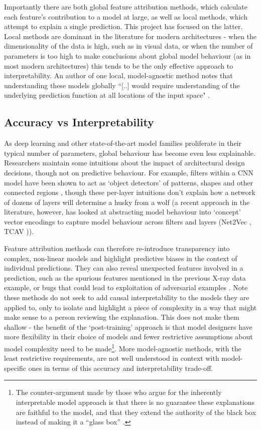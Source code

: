 \documentclass[main]{subfiles}
\begin{document}
Importantly there are both global feature attribution methods, which calculate each feature's contribution to a model at large, as well as local methods, which attempt to explain a single prediction. This project has focused on the latter. Local methods are dominant in the literature for modern architectures - when the dimensionality of the data is high, such as in visual data, or when the number of parameters is too high to make conclusions about global model behaviour (as in most modern architectures) this tends to be the only effective approach to interpretability. An author of one local, model-agnostic method notes that understanding these models globally ``[..] would require understanding of the underlying prediction function at all locations of the input space" \cite{local}. 

\subsection*{Accuracy vs Interpretability}

As deep learning and other state-of-the-art model families proliferate in their typical number of parameters, global behaviour has become even less explainable. Researchers maintain some intuitions about the impact of architectural design decisions, though not on predictive behaviour. For example, filters within a CNN model have been shown to act as `object detectors' of patterns, shapes and other connected regions \cite{objectdetect}, though these per-layer intuitions don't explain how a network of dozens of layers will determine a husky from a wolf (a recent approach in the literature, however, has looked at abstracting model behaviour into `concept' vector encodings to capture model behaviour across  filters and layers (Net2Vec \cite{net2vec}, TCAV \cite{tcav})).

Feature attribution methods can therefore re-introduce transparency into complex, non-linear models and highlight predictive biases in the context of individual predictions. They can also reveal unexpected features involved in a prediction, such as the spurious features mentioned in the previous X-ray data example, or bugs that could lead to exploitation of adversarial examples \cite{adversary}. Note these methods do not seek to add causal interpretability to the models they are applied to, only to isolate and highlight a piece of complexity in a way that might make sense to a person reviewing the explanation. This does not make them shallow - the benefit of the `post-training' approach is that model designers have more flexibility in their choice of models and fewer restrictive assumptions about model complexity need to be made\footnote{The counter-argument made by those who argue for the inherently interpretable model approach is that there is no guarantee these explanations are faithful to the model, and that they extend the authority of the black box instead of making it a ``glass box'' \cite{rudin}.}. More model-agnostic methods, with the least restrictive requirements, are not well understood in context with model-specific ones in terms of this accuracy and interpretability trade-off.
\end{document}
